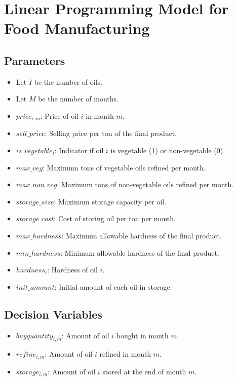 \documentclass{article}
\begin{document}
\section*{Linear Programming Model for Food Manufacturing}

\subsection*{Parameters}
\begin{itemize}
    \item Let \( I \) be the number of oils.
    \item Let \( M \) be the number of months.
    \item \( price_{i,m} \): Price of oil \( i \) in month \( m \).
    \item \( sell\_price \): Selling price per ton of the final product.
    \item \( is\_vegetable_i \): Indicator if oil \( i \) is vegetable (1) or non-vegetable (0).
    \item \( max\_veg \): Maximum tons of vegetable oils refined per month.
    \item \( max\_non\_veg \): Maximum tons of non-vegetable oils refined per month.
    \item \( storage\_size \): Maximum storage capacity per oil.
    \item \( storage\_cost \): Cost of storing oil per ton per month.
    \item \( max\_hardness \): Maximum allowable hardness of the final product.
    \item \( min\_hardness \): Minimum allowable hardness of the final product.
    \item \( hardness_i \): Hardness of oil \( i \).
    \item \( init\_amount \): Initial amount of each oil in storage.
\end{itemize}

\subsection*{Decision Variables}
\begin{itemize}
    \item \( buyquantity_{i,m} \): Amount of oil \( i \) bought in month \( m \).
    \item \( refine_{i,m} \): Amount of oil \( i \) refined in month \( m \).
    \item \( storage_{i,m} \): Amount of oil \( i \) stored at the end of month \( m \).
\end{itemize}
\end{document}
